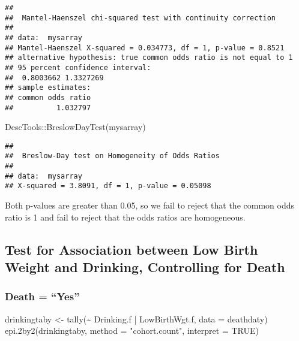 \documentclass[
]{article}
\newenvironment{Shaded}{\begin{snugshade}}{\end{snugshade}}
\newcommand{\AttributeTok}[1]{\textcolor[rgb]{0.77,0.63,0.00}{#1}}
\newcommand{\ConstantTok}[1]{\textcolor[rgb]{0.00,0.00,0.00}{#1}}
\newcommand{\FunctionTok}[1]{\textcolor[rgb]{0.00,0.00,0.00}{#1}}
\newcommand{\NormalTok}[1]{#1}
\newcommand{\OtherTok}[1]{\textcolor[rgb]{0.56,0.35,0.01}{#1}}
\newcommand{\SpecialCharTok}[1]{\textcolor[rgb]{0.00,0.00,0.00}{#1}}
\newcommand{\StringTok}[1]{\textcolor[rgb]{0.31,0.60,0.02}{#1}}
\begin{document}
\begin{verbatim}
## 
##  Mantel-Haenszel chi-squared test with continuity correction
## 
## data:  mysarray
## Mantel-Haenszel X-squared = 0.034773, df = 1, p-value = 0.8521
## alternative hypothesis: true common odds ratio is not equal to 1
## 95 percent confidence interval:
##  0.8003662 1.3327269
## sample estimates:
## common odds ratio 
##          1.032797
\end{verbatim}

\begin{Shaded}
\begin{Highlighting}[]
\NormalTok{DescTools}\SpecialCharTok{::}\FunctionTok{BreslowDayTest}\NormalTok{(mysarray)}
\end{Highlighting}
\end{Shaded}

\begin{verbatim}
## 
##  Breslow-Day test on Homogeneity of Odds Ratios
## 
## data:  mysarray
## X-squared = 3.8091, df = 1, p-value = 0.05098
\end{verbatim}

Both p-values are greater than 0.05, so we fail to reject that the
common odds ratio is 1 and fail to reject that the odds ratios are
homogeneous.

\hypertarget{test-for-association-between-low-birth-weight-and-drinking-controlling-for-death}{%
\subsection{Test for Association between Low Birth Weight and Drinking,
Controlling for
Death}\label{test-for-association-between-low-birth-weight-and-drinking-controlling-for-death}}

\hypertarget{death-yes-1}{%
\subsubsection{Death = ``Yes''}\label{death-yes-1}}

\begin{Shaded}
\begin{Highlighting}[]
\NormalTok{drinkingtaby }\OtherTok{\textless{}{-}} \FunctionTok{tally}\NormalTok{(}\SpecialCharTok{\textasciitilde{}}\NormalTok{ Drinking.f }\SpecialCharTok{|}\NormalTok{ LowBirthWgt.f, }\AttributeTok{data =}\NormalTok{ deathdaty)}
\FunctionTok{epi.2by2}\NormalTok{(drinkingtaby, }\AttributeTok{method =} \StringTok{"cohort.count"}\NormalTok{, }\AttributeTok{interpret =} \ConstantTok{TRUE}\NormalTok{)}
\end{Highlighting}
\end{Shaded}
\end{document}
